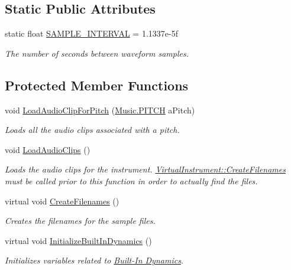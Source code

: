 \subsection*{Static Public Attributes}
\begin{DoxyCompactItemize}
\item 
static float \hyperlink{group___v_i_base_const_ga69a037919b64e1e3e0f2b949b2b6af2c}{S\+A\+M\+P\+L\+E\+\_\+\+I\+N\+T\+E\+R\+V\+AL} = 1.\+1337e-\/5f
\begin{DoxyCompactList}\small\item\em The number of seconds between waveform samples. \end{DoxyCompactList}\end{DoxyCompactItemize}
\subsection*{Protected Member Functions}
\begin{DoxyCompactItemize}
\item 
void \hyperlink{group___v_i_base_pro_func_gadbd95083895b09465fbc5b18115a1dbc}{Load\+Audio\+Clip\+For\+Pitch} (\hyperlink{group___music_enums_ga508f69b199ea518f935486c990edac1d}{Music.\+P\+I\+T\+CH} a\+Pitch)
\begin{DoxyCompactList}\small\item\em Loads all the audio clips associated with a pitch. \end{DoxyCompactList}\item 
void \hyperlink{group___v_i_base_pro_func_ga873242f52d077ca4305b0b69a0100b55}{Load\+Audio\+Clips} ()
\begin{DoxyCompactList}\small\item\em Loads the audio clips for the instrument. \hyperlink{group___v_i_base_virt_func_gaacfc9521214176292bfb9665556fb991}{Virtual\+Instrument\+::\+Create\+Filenames} must be called prior to this function in order to actually find the files. \end{DoxyCompactList}\item 
virtual void \hyperlink{group___v_i_base_virt_func_gaacfc9521214176292bfb9665556fb991}{Create\+Filenames} ()
\begin{DoxyCompactList}\small\item\em Creates the filenames for the sample files. \end{DoxyCompactList}\item 
virtual void \hyperlink{group___v_i_base_virt_func_ga995456c03ee54543b285188c51c29a07}{Initialize\+Built\+In\+Dynamics} ()
\begin{DoxyCompactList}\small\item\em Initializes variables related to \hyperlink{group___audio_DefBID}{Built-\/\+In Dynamics}. \end{DoxyCompactList}\end{DoxyCompactItemize}
